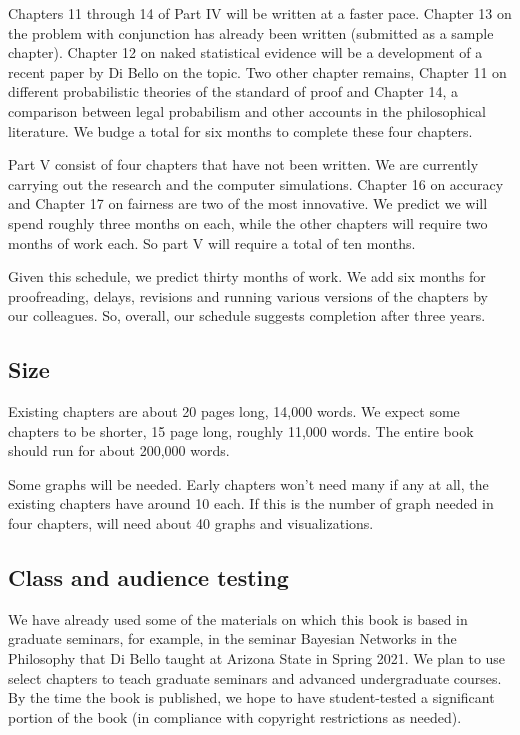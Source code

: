 \documentclass[
  10pt,
  dvipsnames,enabledeprecatedfontcommands]{scrartcl}
\begin{document}
Chapters 11 through 14 of Part IV will be written at a faster pace.
Chapter 13 on the problem with conjunction has already been written
(submitted as a sample chapter). Chapter 12 on naked statistical
evidence will be a development of a recent paper by Di Bello on the
topic. Two other chapter remains, Chapter 11 on different probabilistic
theories of the standard of proof and Chapter 14, a comparison between
legal probabilism and other accounts in the philosophical literature. We
budge a total for six months to complete these four chapters.

Part V consist of four chapters that have not been written. We are
currently carrying out the research and the computer simulations.
Chapter 16 on accuracy and Chapter 17 on fairness are two of the most
innovative. We predict we will spend roughly three months on each, while
the other chapters will require two months of work each. So part V will
require a total of ten months.

Given this schedule, we predict thirty months of work. We add six months
for proofreading, delays, revisions and running various versions of the
chapters by our colleagues. So, overall, our schedule suggests
completion after three years.

\hypertarget{size}{%
\subsection{Size}\label{size}}

Existing chapters are about 20 pages long, 14,000 words. We expect some
chapters to be shorter, 15 page long, roughly 11,000 words. The entire
book should run for about 200,000 words.

Some graphs will be needed. Early chapters won't need many if any at
all, the existing chapters have around 10 each. If this is the number of
graph needed in four chapters, will need about 40 graphs and
visualizations.

\hypertarget{class-and-audience-testing}{%
\subsection{Class and audience
testing}\label{class-and-audience-testing}}

We have already used some of the materials on which this book is based
in graduate seminars, for example, in the seminar Bayesian Networks in
the Philosophy that Di Bello taught at Arizona State in Spring 2021. We
plan to use select chapters to teach graduate seminars and advanced
undergraduate courses. By the time the book is published, we hope to
have student-tested a significant portion of the book (in compliance
with copyright restrictions as needed).
\end{document}
